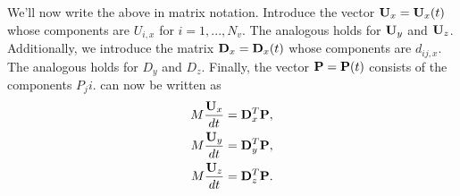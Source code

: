 \documentclass[11pt]{article}
\begin{document}
We'll now write the above in matrix notation. Introduce the vector $\mathbf{U}_x = \mathbf{U}_x(t)$ whose components are $U_{i,x}$ for $i=1,...,N_v$. The analogous holds for $\mathbf{U}_y$ and $\mathbf{U}_z$. Additionally, we introduce the matrix $\mathbf{D}_x = \mathbf{D}_x(t)$ whose components are $d_{ij,x}$. The analogous holds for $D_y$ and $D_z$. Finally, the vector $\mathbf{P} = \mathbf{P}(t)$ consists of the components $P_ji$.  can now be written as 
\begin{align}
    M \frac{\mathbf{U}_x}{dt} &= \mathbf{D}_x^T \mathbf{P}, \nonumber \\
    M \frac{\mathbf{U}_y}{dt} &= \mathbf{D}_y^T \mathbf{P}, \nonumber \\
    M \frac{\mathbf{U}_z}{dt} &= \mathbf{D}_z^T\mathbf{P}.
\end{align}
\end{document}
